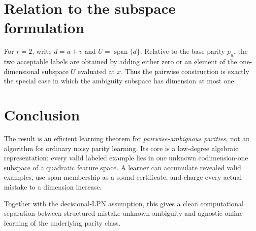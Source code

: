 \documentclass[11pt]{article}
\theoremstyle{definition}
\theoremstyle{remark}
\begin{document}
\section{Relation to the subspace formulation}

For $r=2$, write $d=u+v$ and $U=\operatorname{span}\{d\}$.  Relative to the
base parity $p_u$, the two acceptable labels are obtained by adding either
zero or an element of the one-dimensional subspace $U$ evaluated at $x$.
Thus the pairwise construction is exactly the special case in which the
ambiguity subspace has dimension at most one.

\section{Conclusion}

The result is an efficient learning theorem for \emph{pairwise-ambiguous
parities}, not an algorithm for ordinary noisy parity learning.  Its core is
a low-degree algebraic representation: every valid labeled example lies in
one unknown codimension-one subspace of a quadratic feature space.  A learner
can accumulate revealed valid examples, use span membership as a sound
certificate, and charge every actual mistake to a dimension increase.

Together with the decisional-LPN assumption, this gives a clean computational
separation between structured mistake-unknown ambiguity and agnostic online
learning of the underlying parity class.
\end{document}
